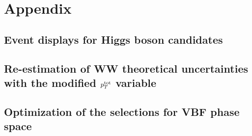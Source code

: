 

\appendix
\chapter{Appendix}\label{app}


\section{Event displays for Higgs boson candidates}\label{app:EvtDisplay}


\section{Re-estimation of WW theoretical uncertainties with the modified $p_{T}^{\mathrm{tot}}$ variable}\label{app:NewPttot}


\section{Optimization of the selections for VBF phase space}\label{app:OptVBFspace}



\pagebreak 